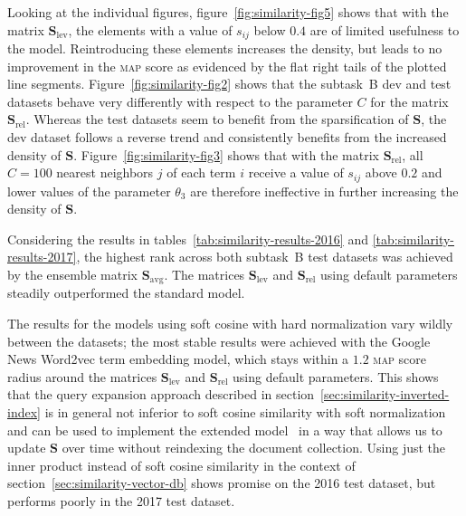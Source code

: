 \documentclass[
  digital, %
  notable, %
  lof,     %
  lot,     %
  nopalatino, color
]{fithesis3}
\newcommand{\op}[1]{\ensuremath{\operatorname{#1}}}
\newcommand{\avg}{\op{avg}}
\def\abbr#1{\textsc{\MakeLowercase{#1}}}
\begin{document}
Looking at the individual figures, figure~\ref{fig:similarity-fig5} shows that
with the matrix $\mathbf S_{\textrm{lev}}$, the
elements with a value of $s_{ij}$ below $0.4$ are of limited usefulness to the model.
Reintroducing these elements increases the density, but leads to no improvement
in the \abbr{MAP} score as evidenced by the flat right tails of the plotted
line segments.
Figure~\ref{fig:similarity-fig2} shows that the subtask~B dev and test datasets behave
very differently with respect to the parameter $C$ for the
matrix $\mathbf S_{\textrm{rel}}$. Whereas the test datasets seem to benefit
from the sparsification of $\mathbf S$, the dev dataset follows a reverse trend
and consistently benefits from the increased density of $\mathbf S$.
Figure~\ref{fig:similarity-fig3} shows that with the matrix
$\mathbf S_{\textrm{rel}}$, all $C=100$ nearest neighbors $j$ of each term $i$
receive a value of $s_{ij}$ above $0.2$ and lower values of the parameter $\theta_3$
are therefore ineffective in further increasing the density of $\mathbf
S$.

Considering the results in tables~\ref{tab:similarity-results-2016} and
\ref{tab:similarity-results-2017}, the highest rank across both subtask~B test datasets
was achieved by the ensemble matrix $\mathbf S_{\avg}$\index{.savg@$\mathbf
S_{\avg}$}. The matrices $\mathbf S_{\textrm{lev}}$ and
$\mathbf S_{\textrm{rel}}$
 using default parameters
steadily outperformed the standard model.

The results for the models using soft cosine with hard normalization vary
wildly between the datasets; the most stable results were achieved with the
Google News Word2vec term embedding
model, which stays within a $1.2$ \abbr{MAP}\index{map@\abbr {MAP}} score radius
around the matrices $\mathbf S_{\textrm{lev}}$ and $\mathbf
S_{\textrm{rel}}$
 using default parameters. This
shows that the query expansion approach described in
section~\ref{sec:similarity-inverted-index} is in general not inferior to
soft cosine similarity with soft normalization and can be used to implement
the extended model~ in a way that allows us to
update $\mathbf S$ over time without reindexing the
document collection. Using just the inner product instead of soft cosine
similarity in the context of section~\ref{sec:similarity-vector-db} shows
promise on the 2016 test dataset, but performs poorly in the 2017 test dataset.
\end{document}
